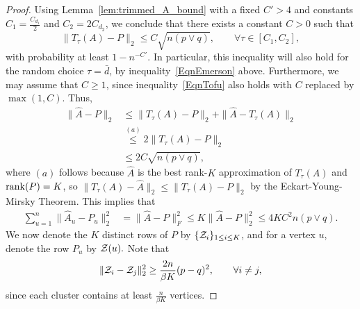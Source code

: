 \documentclass{article}
\begin{document}
\begin{proof}
Using Lemma~\ref{lem:trimmed_A_bound} with a fixed $C' > 4$ and constants $C_1 = \frac{C_{d_1}}{2}$ and $C_2 = 2C_{d_2}$, we conclude that there exists a constant $C > 0$ such that
\begin{equation}
\label{EqnTofu}
\| T_{\tau}(A) - P \|_2 \leq C \sqrt{ n (p \vee q) }, \qquad \forall \tau \in [C_1, C_2],
\end{equation}
with probability at least $1 - n^{-C'}$. In particular, this inequality will also hold for the random choice $\tau = \bar d$, by inequality~\eqref{EqnEmerson} above.
Furthermore, we may assume that $C \geq 1$, since inequality~\eqref{EqnTofu} also holds with $C$ replaced by $\max(1,C).$ Thus,
\begin{align*}
\| \hat{A} - P \|_2 &\leq \| T_\tau(A)  - P \|_2 + \| \hat{A} - T_\tau(A) \|_2 \\
   &\stackrel{(a)}\leq 2\| T_\tau(A) - P \|_2 \\
  &\leq 2C \sqrt{ n (p \vee q)}, 
\end{align*}
where $(a)$ follows because $\hat{A}$ is the best rank-$K$ approximation of $T_\tau (A)$ and $\mathop{\rm rank}(P) = K$, so $\|T_\tau(A) - \hat{A}\|_2 \le \|T_\tau(A) - P\|_2$ by the Eckart-Young-Mirsky Theorem. This implies that
\begin{align*}
\sum_{u=1}^n \| \hat{A}_u - P_u \|_2^2 &= \| \hat{A} - P \|_F^2 \leq K\| \hat A - P \|_2^2 \leq 4 K C^2 n (p \vee q).
\end{align*}
We now denote the $K$ distinct rows of $P$ by $\{{\cal Z}_i\}_{1 \le i \le K}$, and for a vertex $u$, denote the row $P_u$ by ${\cal Z}(u).$ Note that
\[
\| {\cal Z}_i - {\cal Z}_j \|_2^2 \geq \frac{2n}{\beta K} (p - q)^2, \qquad \forall i \neq j,
\]
since each cluster contains at least $\frac{n}{\beta K}$ vertices.



\end{proof}
\end{document}
